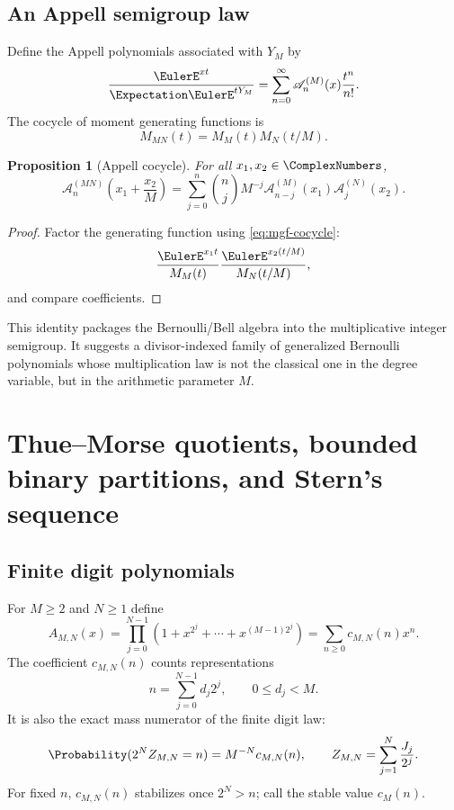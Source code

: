 \documentclass[11pt,oneside]{article}
\newtheorem{proposition}[theorem]{Proposition}
\theoremstyle{definition}
\theoremstyle{remark}
\begin{document}
\subsection{An Appell semigroup law}

Define the Appell polynomials associated with $Y_M$ by
\begin{equation}
 \frac{\EulerE^{xt}}{\Expectation\EulerE^{tY_M}}
 =\sum_{n=0}^{\infty}\mathscr A_n^{(M)}(x)\frac{t^n}{n!}.
 \label{eq:Appell-def}
\end{equation}
The cocycle of moment generating functions is
\begin{equation}
 M_{MN}(t)=M_M(t)M_N(t/M).
 \label{eq:mgf-cocycle}
\end{equation}

\begin{proposition}[Appell cocycle]
\label{prop:Appell-cocycle}
For all $x_1,x_2\in\ComplexNumbers$,
\begin{equation}
 \mathscr A_n^{(MN)}\!\left(x_1+\frac{x_2}{M}\right)
 =\sum_{j=0}^{n}\binom nj M^{-j}
 \mathscr A_{n-j}^{(M)}(x_1)\mathscr A_j^{(N)}(x_2).
 \label{eq:Appell-cocycle}
\end{equation}
\end{proposition}

\begin{proof}
Factor the generating function using \eqref{eq:mgf-cocycle}:
\[
 \frac{\EulerE^{x_1t}}{M_M(t)}
 \frac{\EulerE^{x_2(t/M)}}{M_N(t/M)},
\]
and compare coefficients.
\end{proof}

This identity packages the Bernoulli/Bell algebra into the multiplicative integer semigroup.
It suggests a divisor-indexed family of generalized Bernoulli polynomials whose multiplication
law is not the classical one in the degree variable, but in the arithmetic parameter $M$.

\section{Thue--Morse quotients, bounded binary partitions, and Stern's sequence}
\label{sec:thue-stern}

\subsection{Finite digit polynomials}

For $M\ge2$ and $N\ge1$ define
\begin{equation}
 A_{M,N}(x)
 =\prod_{j=0}^{N-1}
 \left(1+x^{2^j}+\cdots+x^{(M-1)2^j}\right)
 =\sum_{n\ge0}c_{M,N}(n)x^n.
 \label{eq:AMN}
\end{equation}
The coefficient $c_{M,N}(n)$ counts representations
\begin{equation}
 n=\sum_{j=0}^{N-1}d_j2^j,
 \qquad 0\le d_j<M.
 \label{eq:bounded-binary-rep}
\end{equation}
It is also the exact mass numerator of the finite digit law:
\begin{equation}
 \Probability(2^NZ_{M,N}=n)=M^{-N}c_{M,N}(n),
 \qquad
 Z_{M,N}=\sum_{j=1}^{N}\frac{J_j}{2^j}.
 \label{eq:finite-mass}
\end{equation}
For fixed $n$, $c_{M,N}(n)$ stabilizes once $2^N>n$; call the stable value $c_M(n)$.
\end{document}

